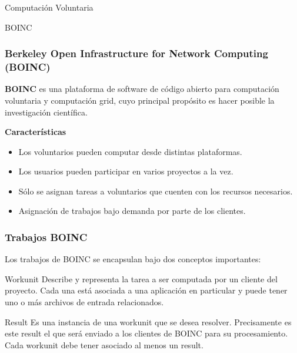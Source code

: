 \begin{subsection}{Computación Voluntaria}
\end{subsection}

\begin{subsection}{BOINC}

	\begin{frame}\frametitle{Berkeley Open Infrastructure for Network Computing (BOINC)}
		\begin{block}{}
			\textbf{BOINC} es una plataforma de software de código abierto para computación voluntaria y computación grid, 
			cuyo principal propósito es hacer posible la investigación científica.
		\end{block}
		\pause
		\vspace{4mm}
		\textbf{Características}
		\begin{itemize}
			\item Los voluntarios pueden computar desde distintas plataformas.
			\item Los usuarios pueden participar en varios proyectos a la vez.
			\item Sólo se asignan tareas a voluntarios que cuenten con los recursos necesarios.
			\item Asignación de trabajos bajo demanda por parte de los clientes.
		\end{itemize}
	\end{frame}

	\begin{frame}\frametitle{Trabajos BOINC}
		Los trabajos de BOINC se encapsulan bajo dos conceptos importantes:
		\pause
		\vspace{4mm}
		\begin{block}{Workunit}
			Describe y representa la tarea a ser computada por un cliente del proyecto. Cada una está asociada a una aplicación en
			particular y puede tener uno o más archivos de entrada relacionados.
		\end{block}
		\pause
		\vspace{4mm}
		\begin{block}{Result}
			Es una instancia de una workunit que se desea resolver. Precisamente es este result el que será enviado a los clientes
			de BOINC para su procesamiento. Cada workunit debe tener asociado al menos un result.
		\end{block}
	\end{frame}


\end{subsection}
